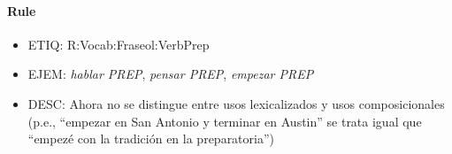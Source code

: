 \documentclass[11pt]{report}
\begin{document}
\paragraph*{Rule}
\begin{itemize}
\item ETIQ: R:Vocab:Fraseol:VerbPrep
\item EJEM: \emph{hablar PREP}, \emph{pensar PREP}, \emph{empezar PREP}  
\item DESC: Ahora no se distingue entre usos lexicalizados y usos composicionales (p.e., ``empezar en San Antonio y terminar en Austin'' se trata igual que ``empezé con la tradición en la preparatoria'') 
\end{itemize}
\end{document}
